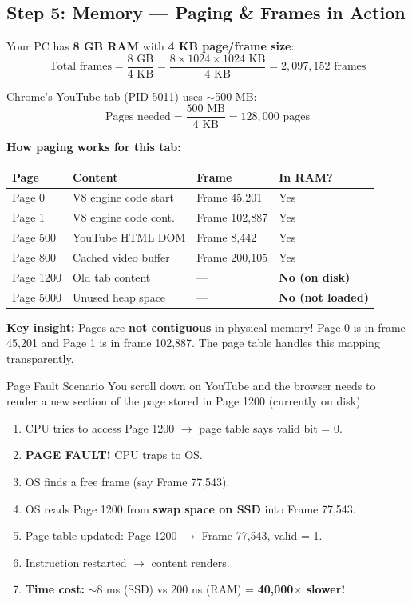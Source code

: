 \documentclass[12pt,a4paper]{article}
\begin{document}
\subsection{Step 5: Memory --- Paging \& Frames in Action}

Your PC has \textbf{8 GB RAM} with \textbf{4 KB page/frame size}:
\[
\text{Total frames} = \frac{8 \text{ GB}}{4 \text{ KB}} = \frac{8 \times 1024 \times 1024 \text{ KB}}{4 \text{ KB}} = 2{,}097{,}152 \text{ frames}
\]

Chrome's YouTube tab (PID 5011) uses $\sim$500 MB:
\[
\text{Pages needed} = \frac{500 \text{ MB}}{4 \text{ KB}} = 128{,}000 \text{ pages}
\]

\textbf{How paging works for this tab:}

\begin{center}
\begin{tabular}{@{} l l l l @{}}
\toprule
\textbf{Page} & \textbf{Content} & \textbf{Frame} & \textbf{In RAM?} \\
\midrule
Page 0 & V8 engine code start & Frame 45,201 & Yes \\
Page 1 & V8 engine code cont. & Frame 102,887 & Yes \\
Page 500 & YouTube HTML DOM & Frame 8,442 & Yes \\
Page 800 & Cached video buffer & Frame 200,105 & Yes \\
Page 1200 & Old tab content & --- & \textbf{No (on disk)} \\
Page 5000 & Unused heap space & --- & \textbf{No (not loaded)} \\
\bottomrule
\end{tabular}
\end{center}

\textbf{Key insight:} Pages are \textbf{not contiguous} in physical memory! Page 0 is in frame 45,201 and Page 1 is in frame 102,887. The page table handles this mapping transparently.

\begin{examplebox}{Page Fault Scenario}
You scroll down on YouTube and the browser needs to render a new section of the page stored in Page 1200 (currently on disk).

\begin{enumerate}
    \item CPU tries to access Page 1200 $\rightarrow$ page table says valid bit = 0.
    \item \textbf{PAGE FAULT!} CPU traps to OS.
    \item OS finds a free frame (say Frame 77,543).
    \item OS reads Page 1200 from \textbf{swap space on SSD} into Frame 77,543.
    \item Page table updated: Page 1200 $\rightarrow$ Frame 77,543, valid = 1.
    \item Instruction restarted $\rightarrow$ content renders.
    \item \textbf{Time cost:} $\sim$8 ms (SSD) vs 200 ns (RAM) = \textbf{40,000$\times$ slower!}
\end{enumerate}
\end{examplebox}
\end{document}
